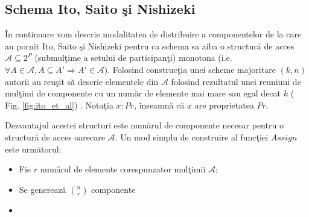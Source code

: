 \documentclass{llncs}
\begin{document}

\subsection{Schema Ito, Saito \c{s}i Nishizeki}
\label{Ito}

\^{I}n continuare vom descrie modalitatea de distribuire a componentelor de la care au pornit Ito, Saito \c{s}i Nishizeki pentru ca schema sa aiba o structur\u{a} de acces $\mathcal{A} \subseteq 2^P$ (submul\c{t}ime a setului de participan\c{t}i) monotona (i.e. $\forall A \in \mathcal{A}, A \subseteq A' \Rightarrow A' \in \mathcal{A}$). \cite{ITO:1989}
Folosind construc\c{t}ia unei scheme majoritare $(k, n)$ autorii au reu\c{s}it s\u{a} descrie elementele din $\mathcal{A}$ folosind rezultatul unei reuniuni de mul\c{t}imi de componente cu un num\u{a}r de elemente mai mare sau egal decat $k$ ( Fig. \ref{fig:ito_et_al}) \cite{ITO:1989}. Nota\c{t}ia $x : Pr$, \^{i}nseamn\u{a} c\u{a} $x$ are proprietatea $Pr$. 

Dezvantajul acestei structuri este num\u{a}rul de componente necesar pentru o structur\u{a} de acces oarecare $\mathcal{A}$. Un mod simplu de construire al func\c{t}iei $Assign$ este urm\u{a}torul:
\begin{itemize}
	\item Fie $r$ num\u{a}rul de elemente corespunzator mul\c{t}imii $\mathcal{A}$;
	\item Se genereaz\u{a} $n \choose r$ componente
	\item 
\end{itemize}
\end{document}
